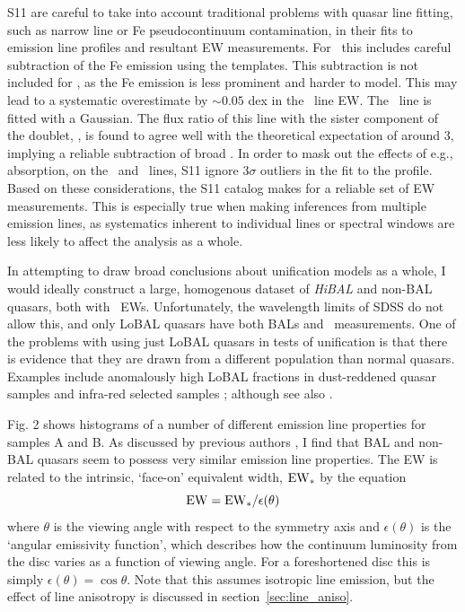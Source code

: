 S11 are careful to take into account traditional problems with quasar line fitting,
such as narrow line or Fe pseudocontinuum contamination, in their fits to 
emission line profiles and resultant EW measurements. For \mgline\
this includes careful subtraction of the Fe emission using the \cite{vestergaard2001}
templates. This subtraction is not included for \civfull,
as the Fe emission is less prominent and harder to model. This may lead to
a systematic overestimate by $\sim0.05$ dex in the \civ\ line EW. 
The \oiiifull\ line is fitted
with a Gaussian. The flux ratio of this line with the sister component 
of the doublet, \oiiidoublet, is found to agree well with the theoretical
expectation of around 3, implying a reliable subtraction of broad \hb.
In order to mask out the effects of e.g., absorption, on the \civ\ and \mg\ lines, 
S11 ignore $3\sigma$ outliers in the fit to the profile. Based on these
considerations, the S11 catalog makes for a reliable set of EW 
measurements. This is especially true when making inferences from 
multiple emission lines, as systematics inherent to individual lines 
or spectral windows are less likely to affect the analysis as a whole.

In attempting to draw broad conclusions about unification models as a whole,
I would ideally construct a large, homogenous dataset of 
{\em HiBAL} and non-BAL quasars, both with \oiiifull\ EWs. Unfortunately,
the wavelength limits of SDSS do not allow this, and only LoBAL quasars have 
both BALs and \ewo\ measurements. One of the problems with
using just LoBAL quasars in tests of unification is that there is evidence 
that they are drawn from a different population than normal quasars. 
Examples include anomalously 
high LoBAL fractions in dust-reddened quasar samples \citep{urrutia2009} 
and infra-red selected samples \citep{dai2012}; 
although see also \cite{lazarova2012}.

Fig. 2 shows histograms of a number of different 
emission line properties for samples A and B. 
As discussed by previous authors \cite[e.g.][]{weymann1991}, I find that BAL
and non-BAL quasars seem to possess very similar emission line 
properties. The EW is related to the intrinsic, `face-on' equivalent width,
${\rm EW}_*$ by the equation
\begin{equation}
{\rm EW} = {\rm EW}_* /\epsilon(\theta)
\end{equation}
where $\theta$ is the viewing angle with respect to the symmetry axis 
and $\epsilon(\theta)$ is the `angular emissivity function', which describes 
how the continuum luminosity from the disc varies as a function of viewing angle.
For a foreshortened disc this is simply $\epsilon(\theta) = \cos \theta$. 
Note that this assumes isotropic line emission, but the effect of line
anisotropy is discussed in section~\ref{sec:line_aniso}.

